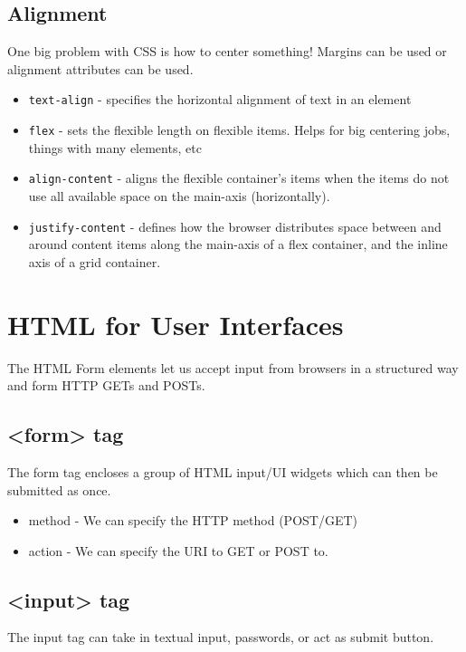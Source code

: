 \documentclass[../CMPUT-404-Notes.tex]{subfiles}
\begin{document}
\subsection{Alignment}
One big problem with CSS is how to center something!
Margins can be used or alignment attributes can be used.

\begin{itemize}
  \item \texttt{text-align} - specifies the horizontal alignment of text in an element
  \item \texttt{flex} - sets the flexible length on flexible items. Helps for big centering jobs, things with many elements, etc
  \item \texttt{align-content} - aligns the flexible container's items when the items do not use all available space on the main-axis (horizontally).
  \item \texttt{justify-content} - defines how the browser distributes space between and around content items along the main-axis of a flex container, and the inline axis of a grid container.
\end{itemize}

\section{HTML for User Interfaces}
The HTML Form elements let us accept input from browsers in a structured way and form HTTP GETs and POSTs.

\subsection{<form> tag}
The form tag encloses a group of HTML input/UI widgets which can then be submitted as once.

\begin{itemize}
  \item method - We can specify the HTTP method (POST/GET)
  \item action - We can specify the URI to GET or POST to.
\end{itemize}

\subsection{<input> tag}
The input tag can take in textual input, passwords, or act as submit button.
\end{document}
